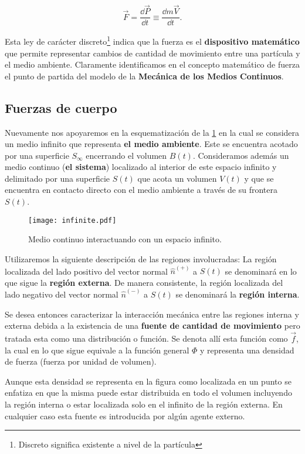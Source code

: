 \documentclass[../notas medios.tex]{subfiles}
\begin{document}
\begin{equation}
\vec F = \frac{\dd{\vec P}}{\dd{t}} \equiv \frac{\dd{m\vec V}}{\dd{t}}.
\label{morate}
\end{equation}

Esta ley de carácter discreto\footnote{Discreto significa existente a nivel de
la partícula} indica que la fuerza es el {\bf dispositivo matemático}  que
permite representar cambios de cantidad de movimiento entre una partícula y el
medio ambiente. Claramente identificamos en el concepto matemático de fuerza el
punto de partida del modelo de la {\bf Mecánica de los Medios Continuos}.

\subsection{Fuerzas de cuerpo}
Nuevamente nos apoyaremos en la esquematización de la \cref{infinite} en la cual
se considera un medio infinito que representa {\bf el medio ambiente}. Este se
encuentra acotado por una superficie ${S_\infty }$ encerrando el volumen $B(t)$.
Consideramos además un medio continuo ({\bf el sistema}) localizado al interior
de este espacio infinito y delimitado por una superficie $S(t)$ que acota un volumen $V(t)$
y que se encuentra en contacto directo con el medio ambiente a través de su frontera $S(t)$.


\begin{figure}[H]
\centering
	\texttt{[image: infinite.pdf]}
	\caption{Medio continuo interactuando con un espacio infinito.}
	\label{infinite}
\end{figure}

Utilizaremos la siguiente descripción de las regiones involucradas: La región
localizada del lado positivo del vector normal ${\hat n^{( + )}}$ a $S(t)$ se
denominará en lo que sigue la {\bf región externa}. De manera consistente, la
región localizada del lado negativo del vector normal ${\hat n^{( - )}}$ a
$S(t)$ se denominará la {\bf región interna}.

Se desea entonces caracterizar la interacción mecánica entre las regiones
interna y externa debida a la existencia de una {\bf fuente de cantidad de
movimiento} pero tratada esta como una distribución o función. Se denota allí
esta función como $\vec f$, la cual en lo que sigue equivale a la función
general $\Phi$ y representa una densidad de fuerza (fuerza por unidad de volumen).

Aunque esta densidad se representa en la figura como localizada en un punto se
enfatiza en que la misma puede estar distribuida en todo el volumen incluyendo
la región interna o estar localizada solo en el infinito de la región externa.
En cualquier caso esta fuente es introducida por algún agente externo.
\end{document}
